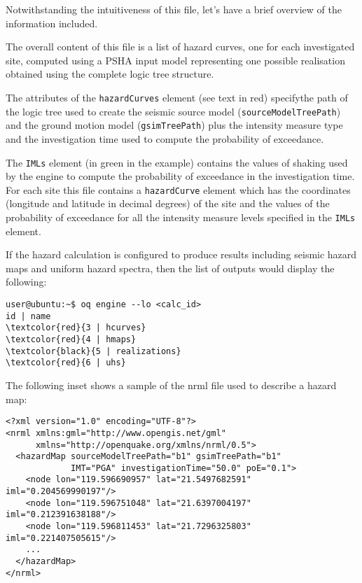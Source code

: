 %

Notwithstanding the intuitiveness of this file, let's have a brief
overview of the information included.

The overall content of this file is a list of hazard curves, one for each
investigated site, computed using a PSHA input model representing one possible realisation obtained using the complete logic tree structure.

The attributes of the \texttt{hazardCurves} element (see text in red) specifythe path of the logic tree used to create the seismic source model
(\texttt{source\-Model\-TreePath}) and the ground motion model
(\texttt{gsim\-Tree\-Path}) plus the intensity measure type and the
investigation time used to compute the probability of exceedance.

The \texttt{IMLs} element (in green in the example) contains the values of shaking used by the engine to compute the probability of exceedance in the investigation time. For each site this file contains a \texttt{hazardCurve} element which has the coordinates (longitude and latitude in decimal degrees) of the site and the values of the probability of exceedance for all the intensity measure levels specified in the \texttt{IMLs} element.

If the hazard calculation is configured to produce results including seismic hazard maps and uniform hazard spectra, then the list of outputs would display the following:

\begin{Verbatim}[frame=single, commandchars=\\\{\}, fontsize=\small]
user@ubuntu:~$ oq engine --lo <calc_id>
id | name
\textcolor{red}{3 | hcurves}
\textcolor{red}{4 | hmaps}
\textcolor{black}{5 | realizations}
\textcolor{red}{6 | uhs}
\end{Verbatim}

The following inset shows a sample of the nrml file used to describe a hazard map:

\begin{verbatim}
<?xml version="1.0" encoding="UTF-8"?>
<nrml xmlns:gml="http://www.opengis.net/gml"
      xmlns="http://openquake.org/xmlns/nrml/0.5">
  <hazardMap sourceModelTreePath="b1" gsimTreePath="b1"
             IMT="PGA" investigationTime="50.0" poE="0.1">
    <node lon="119.596690957" lat="21.5497682591" iml="0.204569990197"/>
    <node lon="119.596751048" lat="21.6397004197" iml="0.212391638188"/>
    <node lon="119.596811453" lat="21.7296325803" iml="0.221407505615"/>
    ...
  </hazardMap>
</nrml>
\end{verbatim}

